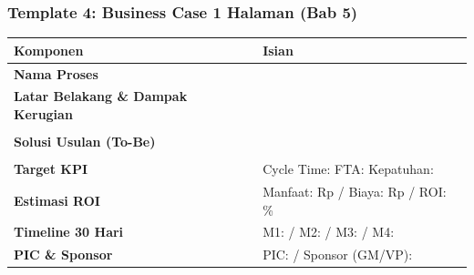 \documentclass[11pt,a4paper]{article}
\begin{document}
\vspace{0.4cm}

\subsubsection*{Template 4: Business Case 1 Halaman (Bab 5)}
\begin{table}[h!]
\centering\small
\renewcommand{\arraystretch}{1.6}
\begin{tabularx}{\textwidth}{@{} l X @{}}
\toprule
\textbf{Komponen} & \textbf{Isian} \\
\midrule
\textbf{Nama Proses} & \dotfill \\
\textbf{Latar Belakang \& Dampak Kerugian} & \dotfill \\ & \dotfill \\
\textbf{Solusi Usulan (To-Be)} & \dotfill \\ & \dotfill \\
\textbf{Target KPI} & Cycle Time: \dotfill \; FTA: \dotfill \; Kepatuhan: \dotfill \\
\textbf{Estimasi ROI} & Manfaat: Rp \dotfill / Biaya: Rp \dotfill / ROI: \dotfill \% \\
\textbf{Timeline 30 Hari} & M1: \dotfill / M2: \dotfill / M3: \dotfill / M4: \dotfill \\
\textbf{PIC \& Sponsor} & PIC: \dotfill / Sponsor (GM/VP): \dotfill \\
\bottomrule
\end{tabularx}
\end{table}
\end{document}
